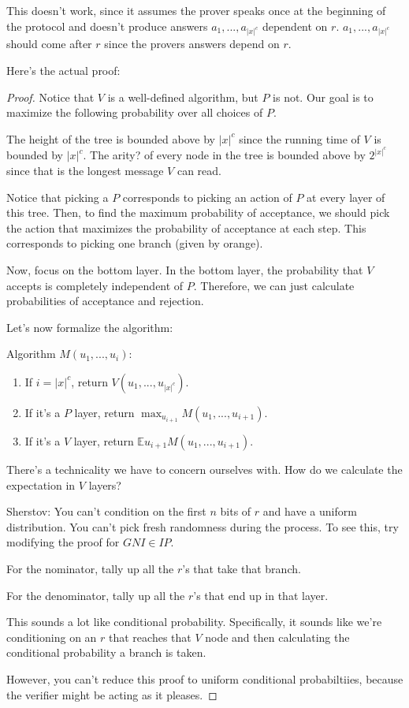 \documentclass{article}
\theoremstyle{definition}
\newcommand{\xtoc}{\lvert x \rvert ^{c}}
\begin{document}
This doesn't work, since it assumes the prover speaks once at the beginning of the protocol and doesn't produce answers $a_{1},...,a_{\xtoc}$ dependent on $r$. $a_{1},...,a_{\xtoc}$ should come after $r$ since the provers answers depend on $r$. 

Here's the actual proof:

\begin{proof}
    Notice that $V$ is a well-defined algorithm, but $P$ is not.
    Our goal is to maximize the following probability over all choices of $P$.

    The height of the tree is bounded above by $\xtoc$ since the running time of $V$ is bounded by $\xtoc$.
    The arity? of every node in the tree is bounded above by $2^{\xtoc}$ since that is the longest
    message $V$ can read.

    Notice that picking a $P$ corresponds to picking an action of $P$ at every layer of this tree.
    Then, to find the maximum probability of acceptance, we should pick the action that maximizes the
    probability of acceptance at each step. This corresponds to picking one branch (given by orange).

    Now, focus on the bottom layer. In the bottom layer, the probability that $V$ accepts is
    completely independent of $P$. Therefore, we can just calculate probabilities of acceptance and rejection.

    Let's now formalize the algorithm:

    Algorithm $M(u_{1},...,u_{i}):$
    \begin{enumerate}
        \item If $i = \xtoc$, return $V(u_{1},...,u_{\xtoc})$.
        \item If it's a $P$ layer, return $\max_{u_{i+1}} M(u_{1},...,u_{i+1})$.
        \item If it's a $V$ layer, return $\mathbb{E}{u_{i+1}} M(u_{1},...,u_{i+1})$.
    \end{enumerate}

    There's a technicality we have to concern ourselves with.
    How do we calculate the expectation in $V$ layers?

    Sherstov: You can't condition on the first $n$ bits of $r$ and have a uniform distribution. You can't pick
    fresh randomness during the process. To see this, try modifying the proof for $GNI \in IP$.

    For the nominator, tally up all the $r$'s that take that branch.

    For the denominator, tally up all the $r$'s that end up in that layer.

    This sounds a lot like conditional probability. Specifically, it sounds like we're conditioning on an $r$
    that reaches that $V$ node and then calculating the conditional probability a branch is taken.

    However, you can't reduce this proof to uniform conditional probabiltiies, because the verifier
    might be acting as it pleases.
\end{proof}
\end{document}
